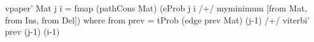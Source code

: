 vpaper' Mat j i = fmap (pathCons Mat)
  (eProb j i /+/ myminimum [from Mat, from Ins, from Del])
 where from prev = tProb (edge prev Mat) (j-1) /+/
                               viterbi' prev (j-1) (i-1)
